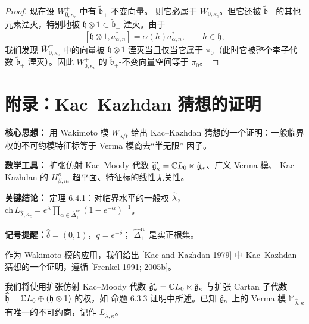 \begin{proof}
    现在设 $W^+_{0,\kappa_c}$ 中有 $\widetilde{\mathfrak b}_+$-不变向量。
    则它必属于 $\overline W^+_{0,\kappa_c}$。但它还被
    $\widetilde{\mathfrak b}_+$ 的其他元素湮灭，特别地被
    $\mathfrak h\otimes1\subset\widetilde{\mathfrak b}_+$ 湮灭。由于
    \[
        [\mathfrak h\otimes1,a^*_{\alpha,n}]
        =\alpha(h)a^*_{\alpha,n},\qquad h\in\mathfrak h,
    \]
    我们发现 $\overline W^+_{0,\kappa_c}$ 中的向量被 $\mathfrak h\otimes1$
    湮灭当且仅当它属于 $\pi_0$（此时它被整个李子代数
    $\widetilde{\mathfrak b}_+$ 湮灭）。因此 $W^+_{0,\kappa_c}$ 的
    $\widetilde{\mathfrak b}_+$-不变向量空间等于 $\pi_0$。
\end{proof}

\section{附录：Kac--Kazhdan 猜想的证明}

\setcounter{theorem}{0}

\begin{keypoints}
    \item \textbf{核心思想：} 用 Wakimoto 模 $W_{\lambda/t}$ 给出 Kac--Kazhdan
    猜想的一个证明：一般临界权的不可约模特征标等于 Verma 模商去“半无限”
    因子。
    \item \textbf{数学工具：} 扩张仿射 Kac--Moody 代数
    $\widehat{\mathfrak g}'_\kappa=\mathbb{C} L_0\ltimes\hat{\mathfrak{g}}_\kappa$、广义 Verma 模、
    Kac--Kazhdan 的 $H^\kappa_{\beta,m}$ 超平面、特征标的线性无关性。
    \item \textbf{关键结论：} 定理 6.4.1：对临界水平的一般权 $\widehat\lambda$，
    $\mathrm{ch}\,L_{\widehat\lambda,\kappa_c}=e^{\widehat\lambda}
    \prod_{\alpha\in\widehat\Delta^{\mathrm{re}}_+}(1-e^{-\alpha})^{-1}$。
    \item \textbf{记号提醒：}$\widehat\delta=(0,1)$，$q=e^{-\delta}$；
    $\widehat\Delta^{\mathrm{re}}_+$ 是实正根集。
\end{keypoints}

作为 Wakimoto 模的应用，我们给出 [Kac and Kazhdan 1979] 中 Kac--Kazhdan
猜想的一个证明，遵循 [Frenkel 1991; 2005b]。

我们将使用扩张仿射 Kac--Moody 代数
$\widehat{\mathfrak g}'_\kappa=\mathbb{C} L_0\ltimes\hat{\mathfrak{g}}_\kappa$ 与扩张 Cartan
子代数 $\widehat{\mathfrak h}=\mathbb{C} L_0\oplus(\mathfrak h\otimes1)$ 的权，如
命题 6.3.3 证明中所述。已知 $\hat{\mathfrak{g}}_\kappa$ 上的 Verma 模
$\mathbb M_{\widehat\lambda,\kappa}$ 有唯一的不可约商，记作
$L_{\widehat\lambda,\kappa}$。

